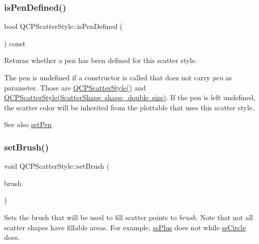 \subsubsection{\texorpdfstring{is\+Pen\+Defined()}{isPenDefined()}}
{\footnotesize\ttfamily bool Q\+C\+P\+Scatter\+Style\+::is\+Pen\+Defined (\begin{DoxyParamCaption}{ }\end{DoxyParamCaption}) const\hspace{0.3cm}{\ttfamily [inline]}}

Returns whether a pen has been defined for this scatter style.

The pen is undefined if a constructor is called that does not carry {\itshape pen} as parameter. Those are \mbox{\hyperlink{class_q_c_p_scatter_style_a8836018d9ad83ccd8870de8315c1be73}{Q\+C\+P\+Scatter\+Style()}} and \mbox{\hyperlink{class_q_c_p_scatter_style_a003d92f74f4561eda111862eadd62f28}{Q\+C\+P\+Scatter\+Style(\+Scatter\+Shape shape, double size)}}. If the pen is left undefined, the scatter color will be inherited from the plottable that uses this scatter style.

\begin{DoxySeeAlso}{See also}
\mbox{\hyperlink{class_q_c_p_scatter_style_a761f1f229cc0ca4703e1e2b89f6dd1ba}{set\+Pen}} 
\end{DoxySeeAlso}
\mbox{\label{class_q_c_p_scatter_style_a74d692aaeb8d4b36d6f7d510e44264b1}} 
\subsubsection{\texorpdfstring{set\+Brush()}{setBrush()}}
{\footnotesize\ttfamily void Q\+C\+P\+Scatter\+Style\+::set\+Brush (\begin{DoxyParamCaption}\item[{const Q\+Brush \&}]{brush }\end{DoxyParamCaption})}

Sets the brush that will be used to fill scatter points to {\itshape brush}. Note that not all scatter shapes have fillable areas. For example, \mbox{\hyperlink{class_q_c_p_scatter_style_adb31525af6b680e6f1b7472e43859349a2d7f1d3c1a148b9d9d17f2fd9cae5eb7}{ss\+Plus}} does not while \mbox{\hyperlink{class_q_c_p_scatter_style_adb31525af6b680e6f1b7472e43859349a7c92a110880d0ef2170dff3a5b4f7779}{ss\+Circle}} does.

